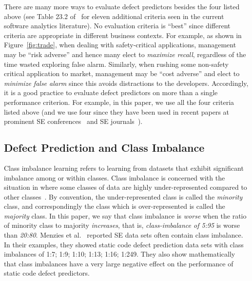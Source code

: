 \documentclass[10pt,conference]{IEEEtran}
\theoremstyle{break}
\theoremstyle{break}
\begin{document}
There are many more ways to evaluate defect predictors besides the four listed above
(see Table 23.2 of~\cite{menzies2014sharing} for   eleven additional
criteria seen in the current software analytics literature).
No evaluation criteria is ``best'' since different  criteria are appropriate in different business contexts. For example, as shown
in 
Figure~\ref{fig:trade},
when dealing
with safety-critical applications, management may be
``risk adverse'' and hence many elect
 to {\em maximize recall}, regardless of the time wasted exploring  false alarm.
 Similarly, 
when rushing some non-safety critical application to market, management may be ``cost adverse''
and elect to {\em minimize false alarm} since this avoids distractions to the developers. 
 Accordingly, it is a good practice to evaluate defect predictors on more than a single performance criterion. For example, in this paper,
we use all the four   criteria listed above
(and we use four since they have
been used in recent papers  
at prominent SE conferences~\cite{ghotra2015revisiting} and SE journals~\cite{fu2016tuning}).
 

\subsection{Defect Prediction and Class Imbalance}
\label{sect:imbalance}

Class imbalance learning refers to learning from datasets that exhibit significant imbalance among or within classes. Class imbalance  is concerned with the situation in where some classes of data are
highly under-represented compared to other classes~\cite{he2009learning}.
By convention,
the under-represented class is called the {\em minority} class,
and correspondingly the class which is over-represented is called the
{\em majority} class. In this paper, we say that class imbalance is {\em worse}
when the ratio of minority class to majority {\em increases}, that is,
{\em class-imbalance of 5:95} is worse than {\em 20:80}. Menzies et al.~\cite{menzies2007problems} reported SE data sets often contain class imbalance. In their examples, they showed static code defect prediction data sets with
class imbalances of 1:7; 1:9; 1:10; 1:13; 1:16; 1:249.
They also show mathematically that  class imbalances  have a very large  negative effect on the performance of static code defect predictors.  
\end{document}
